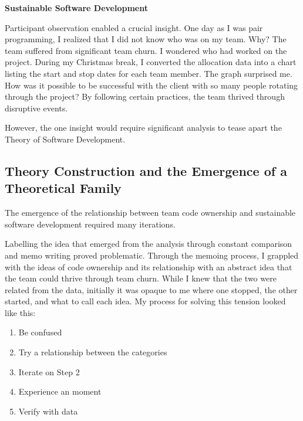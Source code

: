 


\textbf{Sustainable Software Development}

Participant observation enabled a crucial insight. One day as I was pair programming, I realized that I did not know who was on my team. Why? The team suffered from significant team churn. I wondered who had worked on the project. During my Christmas break, I converted the allocation data into a chart listing the start and stop dates for each team member. The graph surprised me. How was it possible to be successful \cite{RalphDimensionsOfSuccess} with the client with so many people rotating through the project? By following certain practices, the team thrived through disruptive events.

However, the one insight would require significant analysis to tease apart the Theory of Software Development. 
\subsection{Theory Construction and the Emergence of a Theoretical Family}
The emergence of the relationship between team code ownership and sustainable software development required many iterations. 

Labelling the idea that emerged from the analysis through constant comparison and memo writing proved problematic. Through the memoing process, I grappled with the ideas of code ownership and its relationship with an abstract idea that the team could thrive through team churn. While I knew that the two were related from the data, initially it was opaque to me where one stopped, the other started, and what to call each idea. My process for solving this tension looked like this:

\begin{enumerate}
  \item Be confused
  \item Try a relationship between the categories
  \item Iterate on Step 2
  \item Experience an  moment
  \item Verify with data
\end{enumerate}

